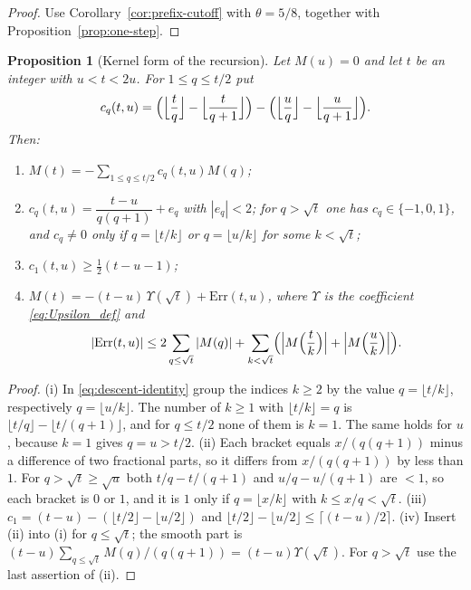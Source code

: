 \documentclass[11pt]{amsart}
\numberwithin{equation}{section}
\theoremstyle{plain}
\newtheorem{proposition}[theorem]{Proposition}
\theoremstyle{definition}
\theoremstyle{remark}
\begin{document}
\begin{proof}
Use Corollary~\ref{cor:prefix-cutoff} with $\theta=5/8$, together with
Proposition~\ref{prop:one-step}.
\end{proof}

\begin{proposition}[Kernel form of the recursion]
\label{prop:kernel}
Let $M(u)=0$ and let $t$ be an integer with $u<t<2u$. For $1\le q\le t/2$ put
\[
c_q(t,u)=\Bigl(\Bigl\lfloor\frac tq\Bigr\rfloor-\Bigl\lfloor\frac t{q+1}\Bigr\rfloor\Bigr)
-\Bigl(\Bigl\lfloor\frac uq\Bigr\rfloor-\Bigl\lfloor\frac u{q+1}\Bigr\rfloor\Bigr).
\]
Then:
\begin{enumerate}[label=\textup{(\roman*)}]
\item $M(t)=-\sum_{1\le q\le t/2}c_q(t,u)M(q)$;
\item $c_q(t,u)=\dfrac{t-u}{q(q+1)}+e_q$ with $|e_q|<2$; for $q>\sqrt t$
one has $c_q\in\{-1,0,1\}$, and $c_q\ne0$ only if $q=\lfloor t/k\rfloor$ or
$q=\lfloor u/k\rfloor$ for some $k<\sqrt t$;
\item $c_1(t,u)\ge\frac12(t-u-1)$;
\item $M(t)=-(t-u)\,\Upsilon(\sqrt t)+\mathrm{Err}(t,u)$, where $\Upsilon$ is the
coefficient \eqref{eq:Upsilon_def} and
\[
|\mathrm{Err}(t,u)|\le2\sum_{q\le\sqrt t}|M(q)|
+\sum_{k<\sqrt t}\Bigl(\Bigl|M\Bigl(\frac tk\Bigr)\Bigr|+\Bigl|M\Bigl(\frac uk\Bigr)\Bigr|\Bigr).
\]
\end{enumerate}
\end{proposition}

\begin{proof}
(i) In \eqref{eq:descent-identity} group the indices $k\ge2$ by the value
$q=\lfloor t/k\rfloor$, respectively $q=\lfloor u/k\rfloor$. The number of
$k\ge1$ with $\lfloor t/k\rfloor=q$ is
$\lfloor t/q\rfloor-\lfloor t/(q+1)\rfloor$, and for $q\le t/2$ none of them
is $k=1$. The same holds for $u$, because $k=1$ gives $q=u>t/2$. (ii) Each
bracket equals $x/(q(q+1))$ minus a difference of two fractional parts, so
it differs from $x/(q(q+1))$ by less than $1$. For $q>\sqrt t\ge\sqrt u$ both
$t/q-t/(q+1)$ and $u/q-u/(q+1)$ are $<1$, so each bracket is $0$ or $1$, and
it is $1$ only if $q=\lfloor x/k\rfloor$ with $k\le x/q<\sqrt t$.
(iii) $c_1=(t-u)-(\lfloor t/2\rfloor-\lfloor u/2\rfloor)$ and
$\lfloor t/2\rfloor-\lfloor u/2\rfloor\le\lceil(t-u)/2\rceil$.
(iv) Insert (ii) into (i) for $q\le\sqrt t$; the smooth part is
$(t-u)\sum_{q\le\sqrt t}M(q)/(q(q+1))=(t-u)\Upsilon(\sqrt t)$. For
$q>\sqrt t$ use the last assertion of (ii).
\end{proof}
\end{document}
